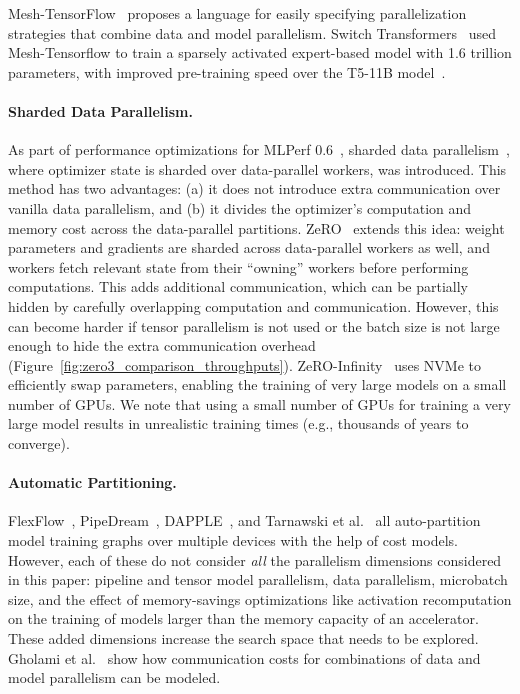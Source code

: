 \documentclass[sigconf,nonacm]{acmart}
\begin{document}
Mesh-TensorFlow~\cite{mesh_tf} proposes a language for easily specifying parallelization strategies that combine data and model parallelism. Switch Transformers~\cite{fedus2021switch} used Mesh-Tensorflow to train a sparsely activated expert-based model with 1.6 trillion parameters, with improved pre-training speed over the T5-11B model~\cite{T5}.

\paragraph{Sharded Data Parallelism.} As part of performance optimizations for MLPerf 0.6~\cite{mattson2019mlperf}, sharded data parallelism~\cite{kumar2019scale, xu2020automatic}, where optimizer state is sharded over data-parallel workers, was introduced. This method has two advantages: (a) it does not introduce extra communication over vanilla data parallelism, and (b) it divides the optimizer's computation and memory cost across the data-parallel partitions. ZeRO~\cite{rajbhandari2019zero,rajbhandari2021zero} extends this idea: weight parameters and gradients are sharded across data-parallel workers as well, and workers fetch relevant state from their ``owning'' workers before performing computations. This adds additional communication, which can be partially hidden by carefully overlapping computation and communication. However, this can become harder if tensor parallelism is not used or the batch size is not large enough to hide the extra communication overhead (Figure~\ref{fig:zero3_comparison_throughputs}). ZeRO-Infinity~\cite{rajbhandari2021zero} uses NVMe to efficiently swap parameters, enabling the training of very large models on a small number of GPUs. We note that using a small number of GPUs for training a very large model results in unrealistic training times (e.g., thousands of years to converge).

\paragraph{Automatic Partitioning.} FlexFlow~\cite{flexflow}, PipeDream~\cite{narayanan2019pipedream}, DAPPLE~\cite{fan2021dapple}, and Tarnawski et al.~\cite{tarnawski2020efficient} all auto-partition model training graphs over multiple devices with the help of cost models. However, each of these do not consider \emph{all} the parallelism dimensions considered in this paper: pipeline and tensor model parallelism, data parallelism, microbatch size, and the effect of memory-savings optimizations like activation recomputation on the training of models larger than the memory capacity of an accelerator. These added dimensions increase the search space that needs to be explored. Gholami et al.~\cite{gholami2018integrated} show how communication costs for combinations of data and model parallelism can be modeled.
\end{document}

